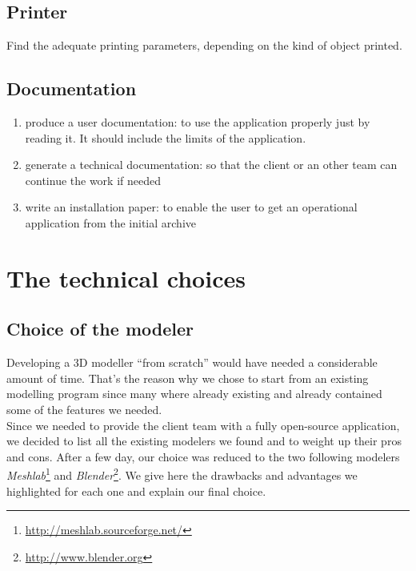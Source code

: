 \documentclass{report}
\begin{document}
\subsection{Printer}

Find the adequate printing parameters, depending on the kind of object printed.

\subsection{Documentation}

\begin{enumerate}
\item produce a user documentation: to use the application properly just by reading it. It should include the limits of the application.
\item generate a technical documentation: so that the client or an other team can continue the work if needed
\item write an installation paper: to enable the user to get an operational application from the initial archive
\end{enumerate}



\section{The technical choices}

\subsection{Choice of the modeler}

Developing a 3D modeller ``from scratch'' would have needed a considerable amount of time. That's the reason why we chose to start from an existing modelling program since many where already existing and already contained some of the features we needed.\\

Since we needed to provide the client team with a fully open-source application, we decided to list all the existing modelers we found and to weight up their pros and cons. After a few day, our choice was reduced to the two following modelers \emph{Meshlab}\footnote{\url{http://meshlab.sourceforge.net/}} and \emph{Blender}\footnote{\url{http://www.blender.org}}. We give here the drawbacks and advantages we highlighted for each one and explain our final choice.

\bigskip
\end{document}
